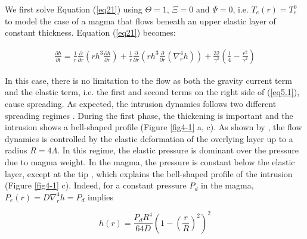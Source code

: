 \begin{article}
        We first solve Equation (\ref{eq21}) using $\Theta=1$, $\Xi=0$
        and $\Psi=0$,  i.e. $T_e(r)=T_{e}^0$  to model  the case  of a
        magma that  flows beneath an  upper elastic layer  of constant
        thickness. Equation (\ref{eq21}) becomes:
		
\begin{eqnarray}
  \frac{\partial h}{\partial t}=\frac{1}{r} \frac{\partial}{\partial r}\left (rh^{3} \frac{\partial h}{\partial r} \right)+ \frac{1}{r}\frac{\partial}{\partial r}\left ( rh^{3} \frac{\partial}{\partial r}\left ( \nabla^{4}_{r}h \right )\right)+\frac{32}{\gamma^{2}} \left(\frac{1}{4}-\frac{r^{2}}{\gamma^{2}}\right)
  \label{eq5.1}
\end{eqnarray}

In this case, there  is no limitation to the flow  as both the gravity
current term and the elastic term,  i.e. the first and second terms on
the right  side of  (\ref{eq5.1}), cause  spreading. As  expected, the
intrusion   dynamics   follows   two   different   spreading   regimes
\citep{Michaut2011,Michaut2013,Bunger2011}.  During  the first  phase,
the  thickening is  important and  the intrusion  shows a  bell-shaped
profile (Figure  \ref{fig4-1} a, c). As  shown by \citet{Michaut2011},
the  flow dynamics  is controlled  by the  elastic deformation  of the
overlying  layer up  to a  radius  $R=4\Lambda$. In  this regime,  the
elastic pressure is dominant over the pressure due to magma weight. In
the magma, the pressure is constant below the elastic layer, except at
the tip \citep{Bunger2011,Michaut2011}, which explains the bell-shaped
profile  of  the intrusion  (Figure  \ref{fig4-1}  c). Indeed,  for  a
constant  pressure  $P_d$   in  the  magma,  $P_e(r)=D\nabla_r^4h=P_d$
implies
	
	\begin{equation}
          h(r)=\frac{P_{d} R^{4}}{64D}\left(1-\left(\frac{r}{R}\right)^2\right)^2
          \label{eq4-1}
	\end{equation}
	

\end{article}
